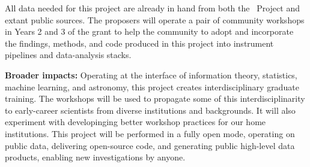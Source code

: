 \documentclass[12pt, fullpage, letterpaper]{article}
\begin{document}
All data needed for this project are already in hand from both the
\EXPRES\ Project and extant public sources.
The proposers will operate a pair of community workshops in
Years 2 and 3 of the grant to help the community to adopt and
incorporate the findings, methods, and code produced in this project
into instrument pipelines and data-analysis stacks.

\textbf{Broader impacts:}
Operating at the interface of information theory, statistics, machine learning,
and astronomy, this project creates interdisciplinary graduate training.
The workshops will be used to propagate some of this interdisciplinarity
to early-career scientists from diverse institutions and backgrounds.
It will also experiment with developinging better workshop practices for our home institutions.
This project will be performed in a fully open mode, operating on
public data, delivering open-source code, and generating public
high-level data products, enabling new investigations by anyone.
\end{document}
